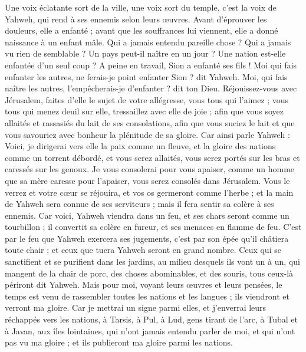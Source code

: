 \begin{multicols}{2}
Une voix éclatante sort de la ville, une voix sort du temple, c'est la voix de Yahweh, qui rend à ses ennemis selon leurs œuvres.
Avant d'éprouver les douleurs, elle a enfanté ; avant que les souffrances lui viennent, elle a donné naissance à un enfant mâle.
Qui a jamais entendu pareille chose ? Qui a jamais vu rien de semblable ? Un pays peut-il naître en un jour ? Une nation est-elle enfantée d'un seul coup ? A peine en travail, Sion a enfanté ses fils !
Moi qui fais enfanter les autres, ne ferais-je point enfanter Sion ? dit Yahweh. Moi, qui fais naître les autres, l'empêcherais-je d'enfanter ? dit ton Dieu.
Réjouissez-vous avec Jérusalem, faites d'elle le sujet de votre allégresse, vous tous qui l'aimez ; vous tous qui menez deuil sur elle, tressaillez avec elle de joie ;
afin que vous soyez allaités et rassasiés du lait de ses consolations, afin que vous suciez le lait et que vous savouriez avec bonheur la plénitude de sa gloire.
Car ainsi parle Yahweh : Voici, je dirigerai vers elle la paix comme un fleuve, et la gloire des nations comme un torrent débordé, et vous serez allaités, vous serez portés sur les bras et caressés sur les genoux.
Je vous consolerai pour vous apaiser, comme un homme que sa mère caresse pour l'apaiser, vous serez consolés dans Jérusalem.
Vous le verrez et votre cœur se réjouira, et vos os germeront comme l'herbe ; et la main de Yahweh sera connue de ses serviteurs ; mais il fera sentir sa colère à ses ennemis.
Car voici, Yahweh viendra dans un feu, et ses chars seront comme un tourbillon ; il convertit sa colère en fureur, et ses menaces en flamme de feu.
C'est par le feu que Yahweh exercera ses jugements, c'est par son épée qu'il châtiera toute chair ; et ceux que tuera Yahweh seront en grand nombre.
Ceux qui se sanctifient et se purifient dans les jardins, au milieu desquels ils vont un à un, qui mangent de la chair de porc, des choses abominables, et des souris, tous ceux-là périront dit Yahweh.
Mais pour moi, voyant leurs œuvres et leurs pensées, le temps est venu de rassembler toutes les nations et les langues ; ils viendront et verront ma gloire.
Car je mettrai un signe parmi elles, et j'enverrai leurs réchappés vers les nations, à Tarsis, à Pul, à Lud, gens tirant de l'arc, à Tubal et à Javan, aux îles lointaines, qui n'ont jamais entendu parler de moi, et qui n'ont pas vu ma gloire ; et ils publieront ma gloire parmi les nations.

\end{multicols}
